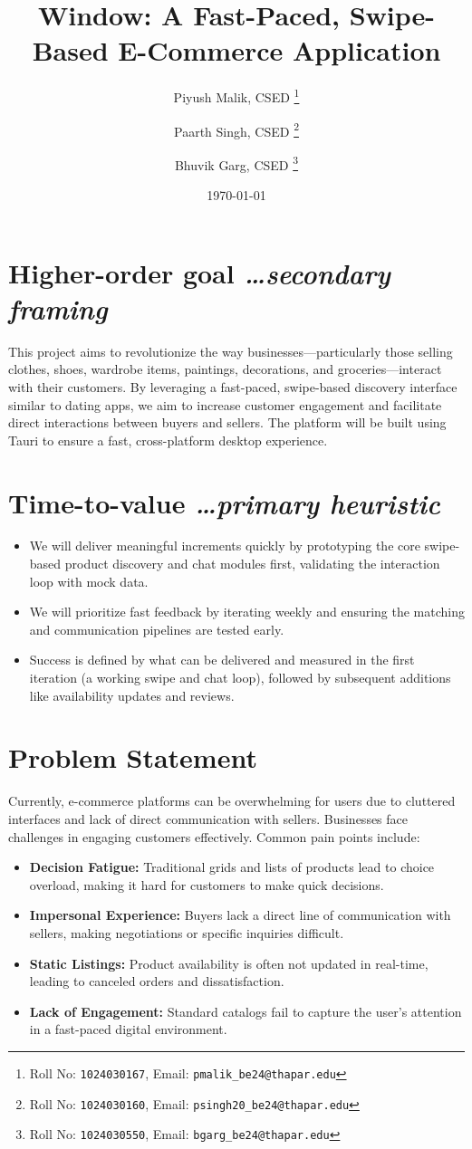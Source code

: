 \documentclass[11pt,a4paper]{article}
\title{Window: A Fast-Paced, Swipe-Based E-Commerce Application}
\author{
  Piyush Malik, CSED%
  \thanks{Roll No: \texttt{1024030167}, %
    Email: \texttt{pmalik\_be24@thapar.edu}}
  \and 
  Paarth Singh, CSED%
  \thanks{Roll No: \texttt{1024030160}, %
    Email: \texttt{psingh20\_be24@thapar.edu}}
  \and 
  Bhuvik Garg, CSED%
  \thanks{Roll No: \texttt{1024030550}, %
    Email: \texttt{bgarg\_be24@thapar.edu}}
}
\date{\today}
\newcommand{\BvrHint}[1]{%
  {\normalfont\normalsize\itshape\hfill #1}}
\begin{document}
\maketitle

\section{Higher-order goal%
  \BvrHint{\ldots secondary framing}}
This project aims to revolutionize the way businesses---particularly those selling clothes, shoes, wardrobe items, paintings, decorations, and groceries---interact with their customers. By leveraging a fast-paced, swipe-based discovery interface similar to dating apps, we aim to increase customer engagement and facilitate direct interactions between buyers and sellers. The platform will be built using Tauri to ensure a fast, cross-platform desktop experience.

\section{Time-to-value %
\BvrHint{\ldots primary heuristic}}
\begin{itemize}[leftmargin=0.7cm]
    \item We will deliver meaningful increments quickly by prototyping the core swipe-based product discovery and chat modules first, validating the interaction loop with mock data.
    \item We will prioritize fast feedback by iterating weekly and ensuring the matching and communication pipelines are tested early.
    \item Success is defined by what can be delivered and measured in the first iteration (a working swipe and chat loop), followed by subsequent additions like availability updates and reviews.
\end{itemize}

\section{Problem Statement}
Currently, e-commerce platforms can be overwhelming for users due to cluttered interfaces and lack of direct communication with sellers. Businesses face challenges in engaging customers effectively. Common pain points include:
\begin{itemize}[leftmargin=0.7cm]
    \item \textbf{Decision Fatigue:} Traditional grids and lists of products lead to choice overload, making it hard for customers to make quick decisions.
    \item \textbf{Impersonal Experience:} Buyers lack a direct line of communication with sellers, making negotiations or specific inquiries difficult.
    \item \textbf{Static Listings:} Product availability is often not updated in real-time, leading to canceled orders and dissatisfaction.
    \item \textbf{Lack of Engagement:} Standard catalogs fail to capture the user's attention in a fast-paced digital environment.
\end{itemize}
\end{document}
